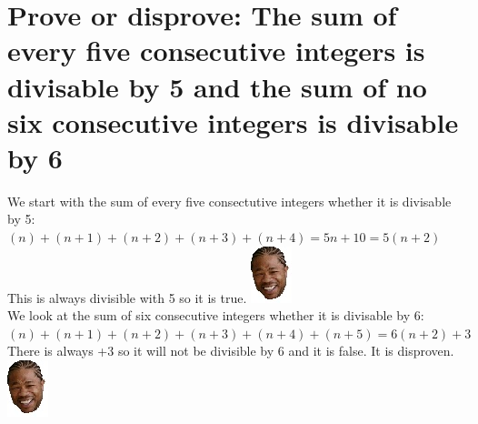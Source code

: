 \section{Prove or disprove: The sum of every five consecutive integers is divisable by 5 and the sum of no six consecutive integers is divisable by 6}
We start with the sum of every five consectutive integers whether it is divisable by 5:\\
$(n)+(n+1)+(n+2)+(n+3)+(n+4) = 5n+10 = 5(n+2)$\\
This is always divisible with 5 so it is true. \includegraphics[scale=0.70]{billeder/xzibit}\\
We look at the sum of six consecutive integers whether it is divisable by 6:\\
$(n)+(n+1)+(n+2)+(n+3)+(n+4)+(n+5) = 6(n+2)+3$\\
There is always +3 so it will not be divisible by 6 and it is false. It is disproven. \includegraphics[scale=0.70]{billeder/xzibit}\\


